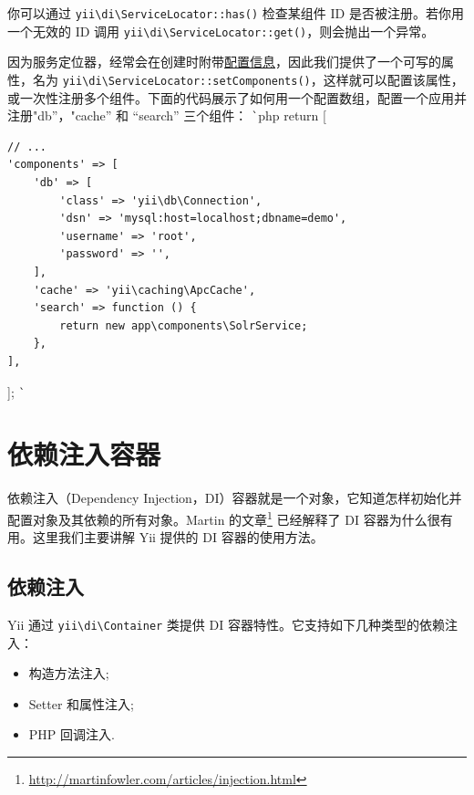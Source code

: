 你可以通过 \texttt{yii{\allowbreak{}\textbackslash}di{\allowbreak{}\textbackslash}ServiceLocator\allowbreak{}::\allowbreak{}has()} 检查某组件 ID 是否被注册。若你用一个无效的 ID 调用 \texttt{yii{\allowbreak{}\textbackslash}di{\allowbreak{}\textbackslash}ServiceLocator\allowbreak{}::\allowbreak{}get()}，则会抛出一个异常。

因为服务定位器，经常会在创建时附带\hyperref[concept-configurations.md]{配置信息}，因此我们提供了一个可写的属性，名为 \texttt{yii{\allowbreak{}\textbackslash}di{\allowbreak{}\textbackslash}ServiceLocator\allowbreak{}::\allowbreak{}setComponents()}，这样就可以配置该属性，或一次性注册多个组件。下面的代码展示了如何用一个配置数组，配置一个应用并注册"db''，"cache'' 和 ``search'' 三个组件：
\lstinline|`|php
return [

\begin{lstlisting}
// ...
'components' => [
    'db' => [
        'class' => 'yii\db\Connection',
        'dsn' => 'mysql:host=localhost;dbname=demo',
        'username' => 'root',
        'password' => '',
    ],
    'cache' => 'yii\caching\ApcCache',
    'search' => function () {
        return new app\components\SolrService;
    },
],
\end{lstlisting}
];
\lstinline|`|



\label{concept-di-container.md}\section{依赖注入容器}
依赖注入（Dependency Injection，DI）容器就是一个对象，它知道怎样初始化并配置对象及其依赖的所有对象。Martin 的文章\footnote{\url{http://martinfowler.com/articles/injection.html}} 已经解释了 DI 容器为什么很有用。这里我们主要讲解 Yii 提供的 DI 容器的使用方法。

\subsection{依赖注入 \label{concept-di-container.md::dependency-injection}}
Yii 通过 \texttt{yii{\allowbreak{}\textbackslash}di{\allowbreak{}\textbackslash}Container} 类提供 DI 容器特性。它支持如下几种类型的依赖注入：

\begin{itemize}
\item 构造方法注入;
\item Setter 和属性注入;
\item PHP 回调注入.
\end{itemize}
